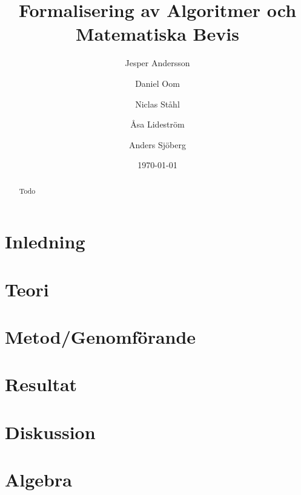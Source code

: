 \documentclass[a4paper]{article}
\title{Formalisering av Algoritmer och Matematiska Bevis}
\author[1]{Jesper Andersson}
\author[1]{Daniel Oom}
\author[1]{Niclas Ståhl}
\author[2]{Åsa Lideström}
\author[2]{Anders Sjöberg}
\affil[1]{Datateknik, Chalmers}
\affil[2]{Mattematik, Göteborgs Universitet}
\date{\today}
\begin{document}
\begin{abstract}
Todo
\end{abstract}

\maketitle
\thispagestyle{empty}
\newpage
\tableofcontents
\newpage

\section{Inledning}

\section{Teori}


\section{Metod/Genomförande}

\section{Resultat}

\section{Diskussion}


\printbibliography

\appendix
\section{Algebra}

\end{document}
